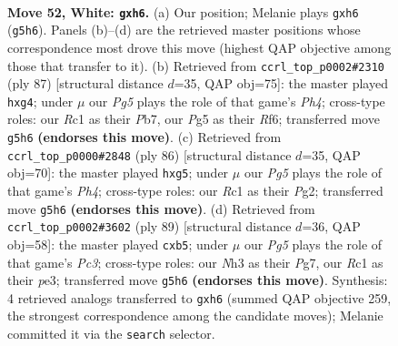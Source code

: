 \documentclass[11pt]{article}
\begin{document}
\clearpage

\begin{figure}[p]\centering
\begin{subfigure}{0.46\textwidth}\centering
\resizebox{\linewidth}{!}{%
\newchessgame
\chessboard[
  setfen={3r4/4kp2/1r5p/p5P1/3pK3/1P5N/1R5P/2R5 w - - 0 52},
  showmover=false,
  pgfstyle=straightmove, color=movearrow, markmove={g5-h6}
]}
\caption{}
\end{subfigure}\hfill
\begin{subfigure}{0.46\textwidth}\centering
\resizebox{\linewidth}{!}{%
\newchessgame
\chessboard[
  setfen={6k1/1p6/5r2/3rpP1p/4R1PP/3p4/P2R2K1/8 b - - 1 44},
  showmover=false,
  pgfstyle=straightmove, color=movearrow, markmove={h5-g4}
]}
\caption{}
\end{subfigure}
\\[4pt]
\begin{subfigure}{0.46\textwidth}\centering
\resizebox{\linewidth}{!}{%
\newchessgame
\chessboard[
  setfen={8/8/r3p3/P4kpp/R6P/8/4pKP1/8 w - - 0 44},
  showmover=false,
  pgfstyle=straightmove, color=movearrow, markmove={h4-g5}
]}
\caption{}
\end{subfigure}\hfill
\begin{subfigure}{0.46\textwidth}\centering
\resizebox{\linewidth}{!}{%
\newchessgame
\chessboard[
  setfen={4k3/6p1/2p1p1r1/1P2R3/8/4P2K/3r1P2/5R2 b - - 4 45},
  showmover=false,
  pgfstyle=straightmove, color=movearrow, markmove={c6-b5}
]}
\caption{}
\end{subfigure}
\caption{\textbf{Move 52, White: \texttt{gxh6}.} (a) Our position; Melanie plays \texttt{gxh6} (\texttt{g5h6}). Panels (b)--(d) are the retrieved master positions whose correspondence most drove this move (highest QAP objective among those that transfer to it). (b) Retrieved from \texttt{ccrl\_top\_p0002\#2310} (ply 87) [structural distance $d$=35, QAP obj=75]: the master played \texttt{hxg4}; under $\mu$ our \emph{Pg5} plays the role of that game's \emph{Ph4}; cross-type roles: our \emph{R}c1 as their \emph{P}b7, our \emph{P}g5 as their \emph{R}f6; transferred move \texttt{g5h6} \textbf{(endorses this move)}. (c) Retrieved from \texttt{ccrl\_top\_p0000\#2848} (ply 86) [structural distance $d$=35, QAP obj=70]: the master played \texttt{hxg5}; under $\mu$ our \emph{Pg5} plays the role of that game's \emph{Ph4}; cross-type roles: our \emph{R}c1 as their \emph{P}g2; transferred move \texttt{g5h6} \textbf{(endorses this move)}. (d) Retrieved from \texttt{ccrl\_top\_p0002\#3602} (ply 89) [structural distance $d$=36, QAP obj=58]: the master played \texttt{cxb5}; under $\mu$ our \emph{Pg5} plays the role of that game's \emph{Pc3}; cross-type roles: our \emph{N}h3 as their \emph{P}g7, our \emph{R}c1 as their \emph{p}e3; transferred move \texttt{g5h6} \textbf{(endorses this move)}. Synthesis: 4 retrieved analogs transferred to \texttt{gxh6} (summed QAP objective 259, the strongest correspondence among the candidate moves); Melanie committed it via the \texttt{search} selector.}
\label{fig:thought-m102}
\end{figure}
\end{document}
